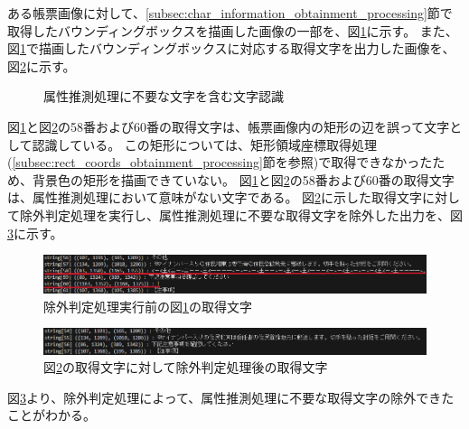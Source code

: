ある帳票画像に対して、\ref{subsec:char_information_obtainment_processing}節で取得したバウンディングボックスを描画した画像の一部を、図\ref{fig:before_exclusion_bbox}に示す。
また、図\ref{fig:before_exclusion_bbox}で描画したバウンディングボックスに対応する取得文字を出力した画像を、図\ref{fig:before_exclusion_string}に示す。
\begin{figure}[tp]
    \begin{center}
        \caption{属性推測処理に不要な文字を含む文字認識}
        \label{fig:before_exclusion_bbox}
    \end{center}
\end{figure}
図\ref{fig:before_exclusion_bbox}と図\ref{fig:before_exclusion_string}の58番および60番の取得文字は、帳票画像内の矩形の辺を誤って文字として認識している。
この矩形については、矩形領域座標取得処理(\ref{subsec:rect_coords_obtainment_processing}節を参照)で取得できなかったため、背景色の矩形を描画できていない。
図\ref{fig:before_exclusion_bbox}と図\ref{fig:before_exclusion_string}の58番および60番の取得文字は、属性推測処理において意味がない文字である。
図\ref{fig:before_exclusion_string}に示した取得文字に対して除外判定処理を実行し、属性推測処理に不要な取得文字を除外した出力を、図\ref{fig:after_exclusion_string}に示す。
\begin{figure}[tp]
    \begin{center}
        \includegraphics[width=15cm]{image/04-implementation/before_exclusion_string.png}
        \caption{除外判定処理実行前の図\ref{fig:before_exclusion_bbox}の取得文字}
        \label{fig:before_exclusion_string}
    \end{center}
\end{figure}
\begin{figure}[tp]
    \begin{center}
        \includegraphics[width=15cm]{image/04-implementation/after_exclusion_string.png}
        \caption{図\ref{fig:before_exclusion_string}の取得文字に対して除外判定処理後の取得文字}
        \label{fig:after_exclusion_string}
    \end{center}
\end{figure}
図\ref{fig:after_exclusion_string}より、除外判定処理によって、属性推測処理に不要な取得文字の除外できたことがわかる。

